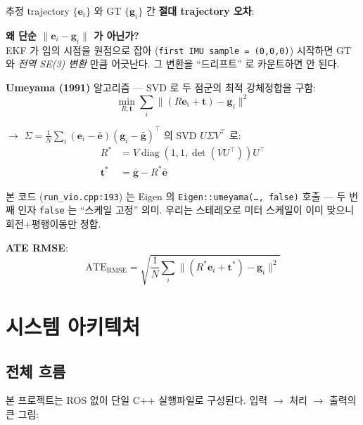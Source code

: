 \documentclass[11pt,a4paper,oneside]{report}
\newcommand{\T}{^{\!\top}}
\DeclareMathOperator{\diag}{diag}
\begin{document}
추정 trajectory \(\{\bm{e}_i\}\) 와 GT \(\{\bm{g}_i\}\) 간 \textbf{절대 trajectory 오차}:

\begin{kbox}
\textbf{왜 단순 \(\|\bm{e}_i - \bm{g}_i\|\) 가 아닌가?}\\[0.3em]
EKF 가 임의 시점을 원점으로 잡아 (\texttt{first IMU sample = (0,0,0)}) 시작하면 GT 와 \emph{전역 SE(3) 변환} 만큼 어긋난다. 그 변환을 ``드리프트'' 로 카운트하면 안 된다.
\end{kbox}

\textbf{Umeyama (1991)} 알고리즘 — SVD 로 두 점군의 최적 강체정합을 구함:
\begin{equation}
\min_{R, \bm{t}} \sum_i \| (R \bm{e}_i + \bm{t}) - \bm{g}_i \|^2
\end{equation}

\(\to\) \(\Sigma = \frac{1}{N} \sum_i (\bm{e}_i - \bar{\bm{e}})(\bm{g}_i - \bar{\bm{g}})\T\) 의 SVD \(U \Sigma V\T\) 로:
\begin{align}
R^* &= V \diag(1, 1, \det(VU\T)) U\T \\
\bm{t}^* &= \bar{\bm{g}} - R^* \bar{\bm{e}}
\end{align}

본 코드 (\texttt{run\_vio.cpp:193}) 는 Eigen 의 \texttt{Eigen::umeyama(\ldots, false)} 호출 — 두 번째 인자 \texttt{false} 는 ``스케일 고정'' 의미. 우리는 스테레오로 미터 스케일이 이미 맞으니 회전+평행이동만 정합.

\textbf{ATE RMSE}:
\begin{equation}
\text{ATE}_{\text{RMSE}} = \sqrt{\frac{1}{N} \sum_i \| (R^* \bm{e}_i + \bm{t}^*) - \bm{g}_i \|^2}
\end{equation}


\chapter{시스템 아키텍처}

\section{전체 흐름}

본 프로젝트는 ROS 없이 단일 C++ 실행파일로 구성된다. 입력 \(\to\) 처리 \(\to\) 출력의 큰 그림:
\end{document}
